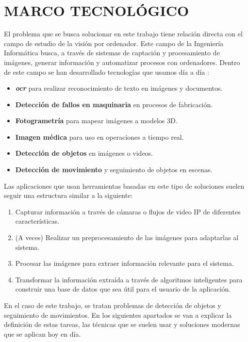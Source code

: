 \section{MARCO TECNOLÓGICO}

El problema que se busca solucionar en este trabajo tiene relación directa con el campo de estudio de la visión por ordenador. Este campo de la Ingeniería Informática busca, 
a través de sistemas de captación y procesamiento de imágenes, generar información y automatizar procesos con ordenadores. \newline Dentro de este campo se han desarrollado tecnologías que usamos día a día
\cite{szeliskiComputerVisionAlgorithms2022}:

\begin{itemize}
    \item \textbf{\textit{\acrfull{ocr}}} para realizar reconocimiento de texto en imágenes y documentos.
    \item \textbf{Detección de fallos en maquinaria} en procesos de fabricación.
    \item \textbf{Fotogrametría} para mapear imágenes a modelos 3D.
    \item \textbf{Imagen médica} para uso en operaciones a tiempo real\cite{NEMESIS3DCM}.
    \item \textbf{Detección de objetos} en imágenes o videos.
    \item \textbf{Detección de movimiento} y seguimiento de objetos en escenas.
\end{itemize}

Las aplicaciones que usan herramientas basadas en este tipo de soluciones suelen seguir una estructura similar a la siguiente:

\begin{enumerate}
    \item Capturar información a través de cámaras o flujos de video IP de diferentes características.
    \item (A veces) Realizar un preprocesamiento de las imágenes para adaptarlas al sistema.
    \item Procesar las imágenes para extraer información relevante para el sistema.
    \item Transformar la información extraída a través de algoritmos inteligentes para construir una base de datos que sea útil para el usuario de la aplicación.
\end{enumerate}

En el caso de este trabajo, se tratan problemas de detección de objetos y seguimiento de movimientos. En los siguientes apartados se van a explicar la definición de estas tareas, las técnicas que se 
suelen usar y soluciones modernas que se aplican hoy en día.

